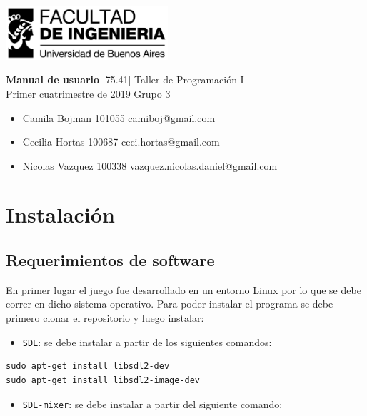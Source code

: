 \documentclass[a4paper]{article}
\newcommand{\materia}{[75.41] Taller de Programación I}
\newcommand{\trabajo}{Manual de usuario}
\newcommand{\cuatrimestre}{Primer cuatrimestre de 2019}
\newcommand{\grupo}{Grupo 3}
\begin{document}
	\setcounter{page}{1}
	
	\begin{titlepage}
		\hfill\includegraphics[width=6cm]{fiuba.jpeg}
		\begin{center}
			\vfill
			\Huge \textbf{\trabajo}
			\vskip2cm
			\Large \materia\\
			\cuatrimestre
			\vfill
			\grupo
			\begin{itemize}
				\item Camila Bojman 101055 camiboj@gmail.com
				\item Cecilia Hortas 100687 ceci.hortas@gmail.com
				\item Nicolas Vazquez 100338 vazquez.nicolas.daniel@gmail.com
			\end{itemize}
			\vskip1cm
		\end{center}
	\end{titlepage}

\section{Instalación}

\subsection{Requerimientos de software}

En primer lugar el juego fue desarrollado en un entorno Linux por lo que se debe correr en dicho sistema operativo. Para poder instalar el programa se debe primero clonar el repositorio y luego instalar:

\begin{itemize}
	\item \texttt{SDL}: se debe instalar a partir de los siguientes comandos:
\end{itemize}

\begin{verbatim}
sudo apt-get install libsdl2-dev
sudo apt-get install libsdl2-image-dev
\end{verbatim}

\begin{itemize}
	\item \texttt{SDL-mixer}: se debe instalar a partir del siguiente comando:
\end{itemize}
\end{document}
